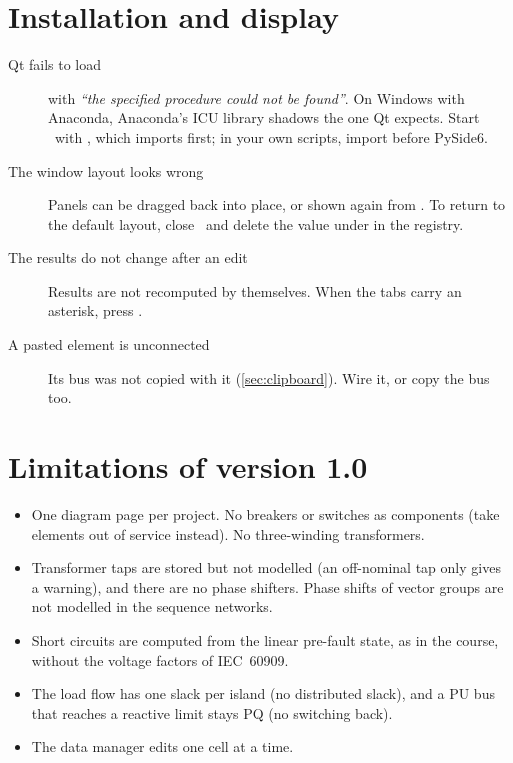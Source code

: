\section{Installation and display}

\begin{description}
  \item[Qt fails to load] with \emph{``the specified procedure could not be found''}. On
    Windows with Anaconda, Anaconda's ICU library shadows the one Qt expects. Start
    \app\ with , which imports  first; in your own
    scripts, import  before PySide6.
  \item[The window layout looks wrong] Panels can be dragged back into place, or shown
    again from . To return to the default layout, close \app\ and delete the
     value under  in the registry.
  \item[The results do not change after an edit] Results are not recomputed by
    themselves. When the tabs carry an asterisk, press .
  \item[A pasted element is unconnected] Its bus was not copied with it
    (\cref{sec:clipboard}). Wire it, or copy the bus too.
\end{description}

\section{Limitations of version 1.0}\label{sec:limitations}

\begin{itemize}
  \item One diagram page per project. No breakers or switches as components (take
    elements out of service instead). No three-winding transformers.
  \item Transformer taps are stored but not modelled (an off-nominal tap only gives a
    warning), and there are no phase shifters. Phase shifts of vector groups are not
    modelled in the sequence networks.
  \item Short circuits are computed from the linear pre-fault state, as in the course,
    without the voltage factors of IEC~60909.
  \item The load flow has one slack per island (no distributed slack), and a PU bus that
    reaches a reactive limit stays PQ (no switching back).
  \item The data manager edits one cell at a time.
\end{itemize}
